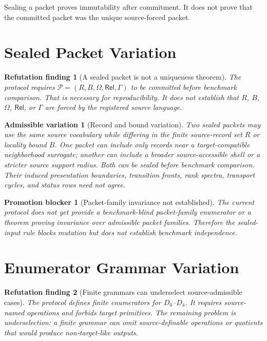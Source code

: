 \documentclass[11pt]{article}
\newcommand{\Pack}{\mathcal{P}}
\newcommand{\Rel}{\mathsf{Rel}}
\newcommand{\GammaB}{\Gamma}
\newtheorem{finding}{Refutation finding}
\newtheorem{variation}{Admissible variation}
\newtheorem{blocker}{Promotion blocker}
\begin{document}
Sealing a packet proves immutability after commitment. It does not prove that
the committed packet was the unique source-forced packet.

\section{Sealed Packet Variation}

\begin{finding}[A sealed packet is not a uniqueness theorem]
The protocol requires \(\Pack=(R,B,\Omega,\Rel,\GammaB)\) to be committed
before benchmark comparison. That is necessary for reproducibility. It does
not establish that \(R\), \(B\), \(\Omega\), \(\Rel\), or \(\GammaB\) are
forced by the registered source language.
\end{finding}

\begin{variation}[Record and bound variation]
Two sealed packets may use the same source vocabulary while differing in the
finite source-record set \(R\) or locality bound \(B\). One packet can include
only records near a target-compatible neighborhood surrogate; another can
include a broader source-accessible shell or a stricter source support
radius. Both can be sealed before benchmark comparison. Their induced
presentation boundaries, transition fronts, rank spectra, transport cycles,
and status rows need not agree.
\end{variation}

\begin{blocker}[Packet-family invariance not established]
The current protocol does not yet provide a benchmark-blind packet-family
enumerator or a theorem proving invariance over admissible packet families.
Therefore the sealed-input rule blocks mutation but does not establish
benchmark independence.
\end{blocker}

\section{Enumerator Grammar Variation}

\begin{finding}[Finite grammars can underselect source-admissible cases]
The protocol defines finite enumerators for \(D_0\)--\(D_4\). It requires
source-named operations and forbids target primitives. The remaining problem
is underselection: a finite grammar can omit source-definable operations or
quotients that would produce non-target-like outputs.
\end{finding}
\end{document}
